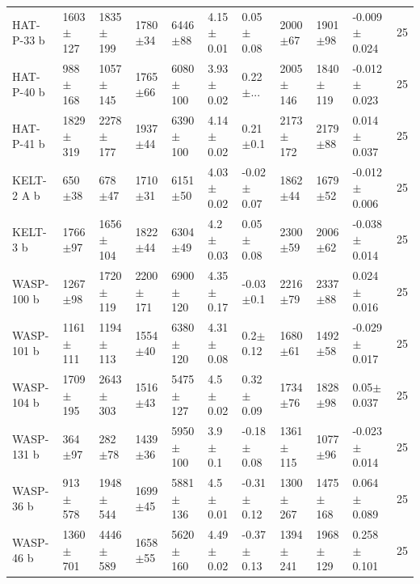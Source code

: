 \begin{subappendices}
{\begin{landscape}
\begin{longtable}{lllllllllll}
HAT-P-33 b  &    1603$\pm$127 &    1835$\pm$199 &   1780$\pm$34 &    6446$\pm$88 &  4.15$\pm$0.01 &   0.05$\pm$0.08 &        2000$\pm$67 &        1901$\pm$98 &  -0.009$\pm$0.024 &                25 \\
HAT-P-40 b  &     988$\pm$168 &    1057$\pm$145 &   1765$\pm$66 &   6080$\pm$100 &  3.93$\pm$0.02 &    0.22$\pm$... &       2005$\pm$146 &       1840$\pm$119 &  -0.012$\pm$0.023 &                25 \\
HAT-P-41 b  &    1829$\pm$319 &    2278$\pm$177 &   1937$\pm$44 &   6390$\pm$100 &  4.14$\pm$0.02 &    0.21$\pm$0.1 &       2173$\pm$172 &        2179$\pm$88 &   0.014$\pm$0.037 &                25 \\
KELT-2 A b  &      650$\pm$38 &      678$\pm$47 &   1710$\pm$31 &    6151$\pm$50 &  4.03$\pm$0.02 &  -0.02$\pm$0.07 &        1862$\pm$44 &        1679$\pm$52 &  -0.012$\pm$0.006 &                25 \\
KELT-3 b    &     1766$\pm$97 &    1656$\pm$104 &   1822$\pm$44 &    6304$\pm$49 &   4.2$\pm$0.03 &   0.05$\pm$0.08 &        2300$\pm$59 &        2006$\pm$62 &  -0.038$\pm$0.014 &                25 \\
WASP-100 b  &     1267$\pm$98 &    1720$\pm$119 &  2200$\pm$171 &   6900$\pm$120 &  4.35$\pm$0.17 &   -0.03$\pm$0.1 &        2216$\pm$79 &        2337$\pm$88 &   0.024$\pm$0.016 &                25 \\
WASP-101 b  &    1161$\pm$111 &    1194$\pm$113 &   1554$\pm$40 &   6380$\pm$120 &  4.31$\pm$0.08 &    0.2$\pm$0.12 &        1680$\pm$61 &        1492$\pm$58 &  -0.029$\pm$0.017 &                25 \\
WASP-104 b  &    1709$\pm$195 &    2643$\pm$303 &   1516$\pm$43 &   5475$\pm$127 &   4.5$\pm$0.02 &   0.32$\pm$0.09 &        1734$\pm$76 &        1828$\pm$98 &    0.05$\pm$0.037 &                25 \\
WASP-131 b  &      364$\pm$97 &      282$\pm$78 &   1439$\pm$36 &   5950$\pm$100 &    3.9$\pm$0.1 &  -0.18$\pm$0.08 &       1361$\pm$115 &        1077$\pm$96 &  -0.023$\pm$0.014 &                25 \\
WASP-36 b   &     913$\pm$578 &    1948$\pm$544 &   1699$\pm$45 &   5881$\pm$136 &   4.5$\pm$0.01 &  -0.31$\pm$0.12 &       1300$\pm$267 &       1475$\pm$168 &   0.064$\pm$0.089 &                25 \\
WASP-46 b   &    1360$\pm$701 &    4446$\pm$589 &   1658$\pm$55 &   5620$\pm$160 &  4.49$\pm$0.02 &  -0.37$\pm$0.13 &       1394$\pm$241 &       1968$\pm$129 &   0.258$\pm$0.101 &                25 \\

\end{longtable}
\end{landscape}}
\end{subappendices}
